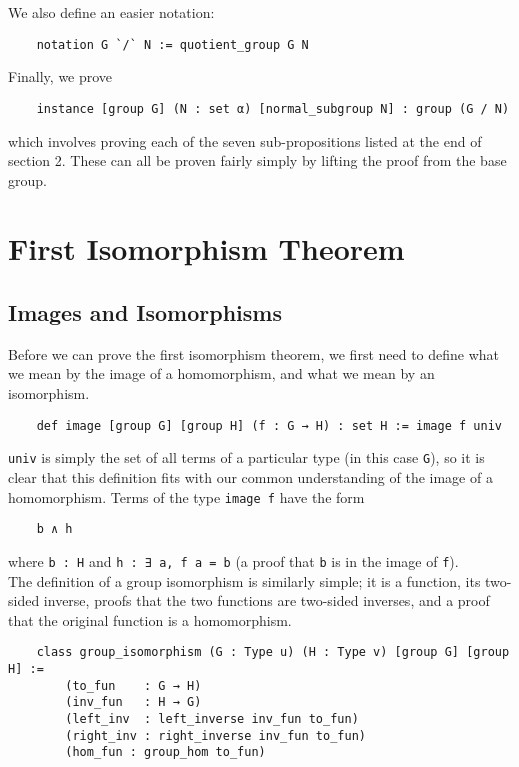 \documentclass[runningheads,a4paper]{llncs}
\renewcommand{\-}{\setminus}
\begin{document}
We also define an easier notation:

\begin{lstlisting}
    notation G `/` N := quotient_group G N
\end{lstlisting}

Finally, we prove

\begin{lstlisting}
    instance [group G] (N : set α) [normal_subgroup N] : group (G / N)
\end{lstlisting}

which involves proving each of the seven sub-propositions listed at the end of section 2. These can all be proven fairly simply by lifting the proof from the base group.

\section{First Isomorphism Theorem}

\subsection{Images and Isomorphisms}

Before we can prove the first isomorphism theorem, we first need to define what we mean by the image of a homomorphism, and what we mean by an isomorphism.

\begin{lstlisting}
    def image [group G] [group H] (f : G → H) : set H := image f univ
\end{lstlisting}

\lstinline{univ} is simply the set of all terms of a particular type (in this case \lstinline{G}), so it is clear that this definition fits with our common understanding of the image of a homomorphism. Terms of the type \lstinline{image f} have the form

\begin{lstlisting}
    b ∧ h 
\end{lstlisting}

where \lstinline{b : H} and \lstinline{h : ∃ a, f a = b} (a proof that \lstinline{b} is in the image of \lstinline{f}).\\

The definition of a group isomorphism is similarly simple; it is a function, its two-sided inverse, proofs that the two functions are two-sided inverses, and a proof that the original function is a homomorphism.

\begin{lstlisting}
    class group_isomorphism (G : Type u) (H : Type v) [group G] [group H] :=
        (to_fun    : G → H)
        (inv_fun   : H → G)
        (left_inv  : left_inverse inv_fun to_fun)
        (right_inv : right_inverse inv_fun to_fun)
        (hom_fun : group_hom to_fun)
\end{lstlisting}
\end{document}
